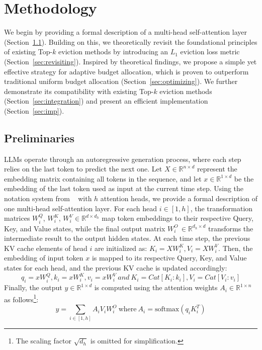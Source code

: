 

\section{Methodology}
\label{sec:method}
We begin by providing a formal description of a multi-head self-attention layer (Section~\ref{sec:pre}).
Building on this, we theoretically revisit the foundational principles of existing Top-$k$ eviction methods by introducing an $L_1$ eviction loss metric (Section~\ref{sec:revisiting}).
Inspired by theoretical findings, we propose a simple yet effective strategy for adaptive budget allocation, which is proven to outperform traditional uniform budget allocation (Section~\ref{sec:optimizing}).
We further demonstrate its compatibility with existing Top-$k$ eviction methods (Section~\ref{sec:integration}) and present an efficient implementation (Section~\ref{sec:imp}).





\subsection{Preliminaries}
\label{sec:pre}
LLMs operate through an autoregressive generation process, where each step relies on the last token to predict the next one. Let $X\in \mathbb{R}^{n \times d}$ represent the embedding matrix containing all tokens in the sequence, and let $x \in \mathbb{R}^{1 \times d}$ be the embedding of the last token used as input at the current time step.
Using the notation system from ~\cite{liu2023dejavucontextualsparsity} with
$h$ attention heads, we provide a formal description of one multi-head self-attention layer.
For each head $i \in [1, h]$, the transformation matrices $W_i^Q$, $W_i^K$, $W_i^V \in \mathbb{R}^{d \times d_h}$ map token embeddings to their respective Query, Key, and Value states, while the final output matrix $W_i^O \, \in \mathbb{R}^{d_h \times d}$ transforms the intermediate result to the output hidden states. At each time step, the previous KV cache elements of head $i$ are initialized as:
$
	K_i = XW_i^K,V_i=XW_i^V
$.
Then, the embedding of input token $x$ is mapped to its respective  Query, Key, and Value states  for each head, and the previous KV cache is updated accordingly:
{\small
\begin{equation}
	q_i = xW_i^Q,k_i = xW_i^K,v_i = xW_i^V
    \: and \:
	K_i = Cat[K_i:k_i],V_i=Cat[V_i:v_i]
\end{equation}
}
Finally, the output $y \in \mathbb{R}^{1 \times d}$ is computed using the attention weights $A_i \in \mathbb{R}^{1 \times n}$ as follows\footnote{The scaling factor $\sqrt{d_h}$ is omitted for simplification.}:
{\small
\begin{equation}
	y = \sum_{i \in [1, h]} A_i V_i W_i^O \: \text{where} \: 	A_i = \text{softmax}(q_{i}K_i^{T})
\end{equation}
}
